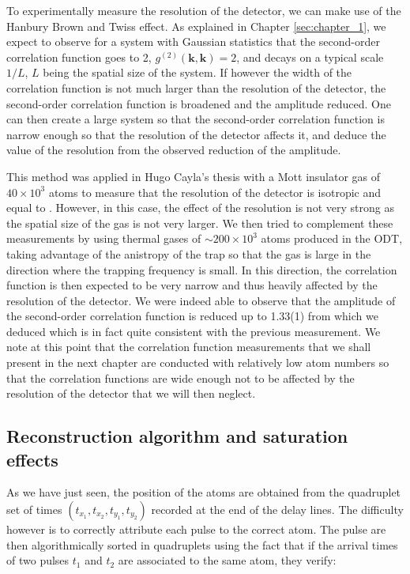  To experimentally measure the resolution of the detector, we can make use of the Hanbury Brown and Twiss effect. As explained in Chapter \ref{sec:chapter_1}, we expect to observe for a system with Gaussian statistics that the second-order correlation function goes to 2, $g^{(2)} (\bm{k},\bm{k})=2$, and decays on a typical scale $1/L$, $L$ being the spatial size of the system. If however the width of the correlation function is not much larger than the resolution of the detector, the second-order correlation function is broadened and the amplitude reduced. One can then create a large system so that the second-order correlation function is narrow enough so that the resolution of the detector affects it, and deduce the value of the resolution from the observed reduction of the amplitude.
 
 This method was applied in Hugo Cayla's thesis \cite{cayla_these} with a Mott insulator gas of $40 \times 10^3$ atoms to measure that the resolution of the detector is isotropic and equal to . However, in this case, the effect of the resolution is not very strong as the spatial size of the gas is not very larger. We then tried to complement these measurements by using thermal gases of $\sim 200 \times 10^3$ atoms produced in the ODT, taking advantage of the anistropy of the trap so that the gas is large in the direction where the trapping frequency is small. In this direction, the correlation function is then expected to be very narrow and thus heavily affected by the resolution of the detector. We were indeed able to observe that the amplitude of the second-order correlation function is reduced up to 1.33(1) from which we deduced  which is in fact quite consistent with the previous measurement. We note at this point that the correlation function measurements that we shall present in the next chapter are conducted with relatively low atom numbers so that the correlation functions are wide enough not to be affected by the resolution of the detector that we will then neglect.


\subsection{Reconstruction algorithm and saturation effects}

As we have just seen, the position of the atoms are obtained from the quadruplet set of times $(t_{x_1},t_{x_2},t_{y_1},t_{y_2})$ recorded at the end of the delay lines. The difficulty however is to correctly attribute each pulse to the correct atom. The pulse are then algorithmically sorted in quadruplets using the fact that if the arrival times of two pulses $t_1$ and $t_2$ are associated to the same atom, they verify:

